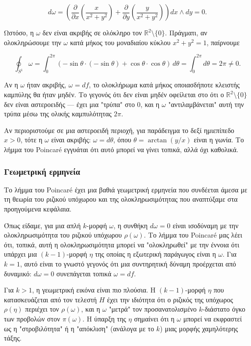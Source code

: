 \documentclass[12pt]{article}
\begin{document}
\[
d\omega = \left( \frac{\partial}{\partial x} \left( \frac{x}{x^2 + y^2} \right) + \frac{\partial}{\partial y} \left( \frac{y}{x^2 + y^2} \right) \right) dx \wedge dy = 0.
\]

Ωστόσο, η $\omega$ δεν είναι ακριβής σε ολόκληρο τον $\mathbb{R}^2 \setminus \{0\}$. Πράγματι, αν ολοκληρώσουμε την $\omega$ κατά μήκος του μοναδιαίου κύκλου $x^2 + y^2 = 1$, παίρνουμε

\[
\oint_{S^1} \omega = \int_0^{2\pi} (-\sin\theta \cdot (-\sin\theta) + \cos\theta \cdot \cos\theta) \, d\theta = \int_0^{2\pi} d\theta = 2\pi \neq 0.
\]

Αν η $\omega$ ήταν ακριβής, $\omega = df$, το ολοκλήρωμα κατά μήκος οποιασδήποτε κλειστής καμπύλης θα ήταν μηδέν. Το γεγονός ότι δεν είναι μηδέν οφείλεται στο ότι ο $\mathbb{R}^2 \setminus \{0\}$ δεν είναι αστεροειδής — έχει μια "τρύπα" στο $0$, και η $\omega$ "αντιλαμβάνεται" αυτή την τρύπα μέσω της ολικής καμπυλότητας $2\pi$.

Αν περιοριστούμε σε μια αστεροειδή περιοχή, για παράδειγμα το δεξί ημιεπίπεδο $x > 0$, τότε η $\omega$ είναι ακριβής: $\omega = d\theta$, όπου $\theta = \arctan(y/x)$ είναι η γωνία. Το λήμμα του Poincaré εγγυάται ότι αυτό μπορεί να γίνει τοπικά, αλλά όχι καθολικά.

\subsubsection{Γεωμετρική ερμηνεία}

Το λήμμα του Poincaré έχει μια βαθιά γεωμετρική ερμηνεία που συνδέεται άμεσα με τη θεωρία του ριζικού υπόχωρου και της ολοκληρωσιμότητας που αναπτύξαμε στα προηγούμενα κεφάλαια.

Όπως είδαμε, για μια απλή $k$-μορφή $\omega$, η συνθήκη $d\omega = 0$ είναι ισοδύναμη με την ολοκληρωσιμότητα του ριζικού υπόχωρου $\rho(\omega)$. Το λήμμα του Poincaré μας λέει ότι, τοπικά, αυτή η ολοκληρωσιμότητα μπορεί να "ολοκληρωθεί" με την έννοια ότι υπάρχει μια $(k-1)$-μορφή $\eta$ της οποίας η εξωτερική παράγωγος είναι η $\omega$. Για $k=1$, αυτό είναι το γνωστό γεγονός ότι μια συντηρητική δύναμη προέρχεται από δυναμικό: $d\omega = 0$ συνεπάγεται τοπικά $\omega = df$.

Για $k > 1$, η γεωμετρική εικόνα είναι πιο πλούσια. Η $(k-1)$-μορφή $\eta$ που κατασκευάζεται από τον τελεστή $H$ έχει την ιδιότητα ότι ο ριζικός της υπόχωρος $\rho(\eta)$ περιέχει τον $\rho(\omega)$, και η $\omega$ "μετρά" τον προσανατολισμένο $k$-διάστατο όγκο των προβολών στον $\pi(\omega)$. Η ύπαρξη της $\eta$ σημαίνει ότι η $\omega$ μπορεί να εκφραστεί ως η "στροβιλότητα" ή η "απόκλιση" (ανάλογα με το $k$) μιας μορφής χαμηλότερης τάξης.
\end{document}
